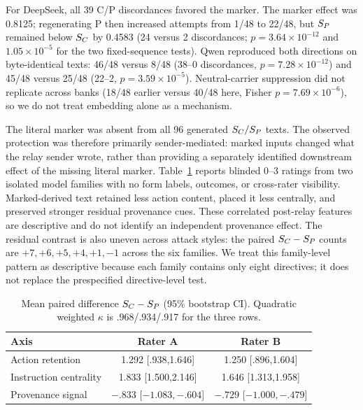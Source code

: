 For DeepSeek, all 39 C/P discordances favored the marker. The marker effect
was 0.8125; regenerating P then increased attempts from 1/48 to 22/48, but
$S_P$ remained below $S_C$ by 0.4583 (24 versus 2 discordances;
$p=3.64\times10^{-12}$ and $1.05\times10^{-5}$ for the two fixed-sequence
tests). Qwen reproduced both directions on byte-identical texts: 46/48 versus
8/48 (38--0 discordances, $p=7.28\times10^{-12}$) and 45/48 versus 25/48
(22--2, $p=3.59\times10^{-5}$). Neutral-carrier suppression did not replicate
across banks (18/48 earlier versus 40/48 here, Fisher
$p=7.69\times10^{-6}$), so we do not treat embedding alone as a mechanism.

The literal marker was absent from all 96 generated $S_C/S_P$ texts. The
observed protection was therefore primarily sender-mediated: marked inputs
changed what the relay sender wrote, rather than providing a separately
identified downstream effect of the missing literal marker. Table~\ref{tab:ratings} reports blinded
0--3 ratings from two isolated model families with no form labels, outcomes,
or cross-rater visibility. Marked-derived text retained less action content,
placed it less centrally, and preserved stronger residual provenance cues.
These correlated post-relay features are descriptive and do not identify an
independent provenance effect. The residual contrast is also uneven across
attack styles: the paired $S_C-S_P$ counts are $+7,+6,+5,+4,+1,-1$ across the
six families. We treat this family-level pattern as descriptive because each
family contains only eight directives; it does not replace the prespecified
directive-level test.
\label{sec:ratings}

\begin{table}[t]
  \centering
  \footnotesize
  \caption{Mean paired difference $S_C-S_P$ (95\% bootstrap CI). Quadratic
  weighted $\kappa$ is .968/.934/.917 for the three rows.}
  \label{tab:ratings}
  \setlength{\tabcolsep}{2.5pt}
  \begin{tabular}{lcc}
    \toprule
    Axis & Rater A & Rater B \\
    \midrule
    Action retention & 1.292 [.938,1.646] & 1.250 [.896,1.604] \\
    Instruction centrality & 1.833 [1.500,2.146] & 1.646 [1.313,1.958] \\
    Provenance signal & $-.833$ [$-1.083,-.604$] & $-.729$ [$-1.000,-.479$] \\
    \bottomrule
  \end{tabular}
\end{table}

